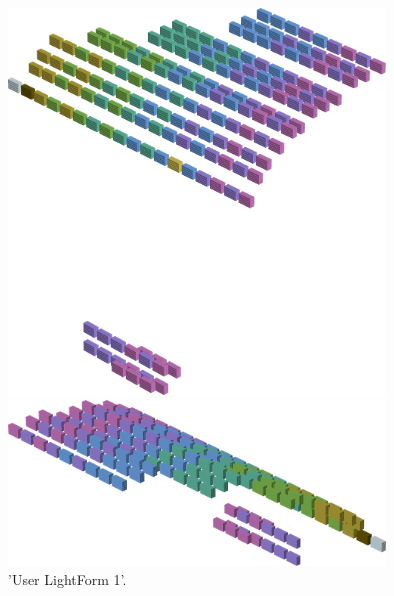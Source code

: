 %
\begin{minipage}[b]{0.48\linewidth}
\begin{figure}[H]
    \centering
    \begin{adjustbox}{width=5cm,margin=0cm 0cm}
      \includegraphics[width=10cm]{src/colorspace_patterns/pattern9-45.png}%
    \end{adjustbox}
    \begin{adjustbox}{width=5cm,margin=0cm 0cm}
      \includegraphics[width=10cm]{src/colorspace_patterns/pattern9-225.png}%
    \end{adjustbox}
\caption{'User LightForm 1'.}
\end{figure}
\end{minipage}
